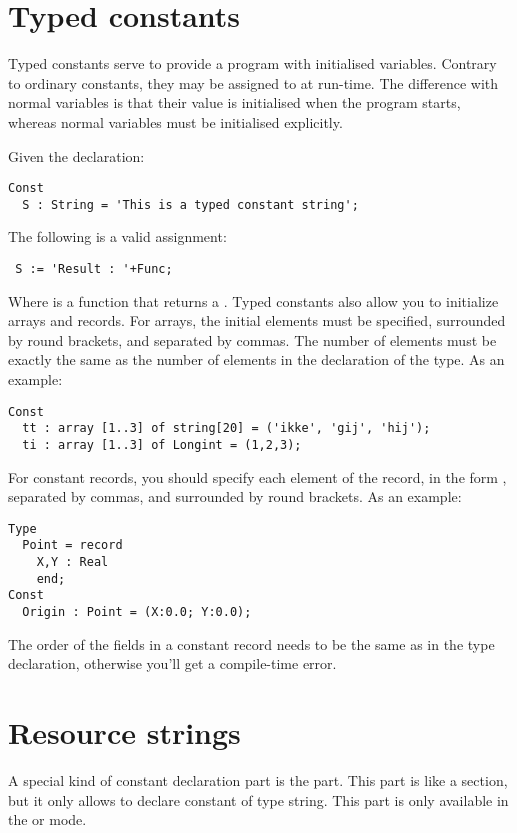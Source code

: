 \documentclass{report}
\begin{document}
\section{Typed constants}
Typed constants serve to provide a program with initialised variables.
Contrary to ordinary constants, they may be assigned to at run-time.
The difference with normal variables is that their value is initialised
when the program starts, whereas normal variables must be initialised
explicitly.

Given the declaration:
\begin{verbatim}
Const
  S : String = 'This is a typed constant string';
\end{verbatim}
The following is a valid assignment:
\begin{verbatim}
 S := 'Result : '+Func;
\end{verbatim}
Where  is a function that returns a .
Typed constants also allow you to initialize arrays and records. For arrays,
the initial elements must be specified, surrounded by round brackets, and
separated by commas. The number of elements must be exactly the same as
the number of elements in the declaration of the type.
As an example:
\begin{verbatim}
Const
  tt : array [1..3] of string[20] = ('ikke', 'gij', 'hij');
  ti : array [1..3] of Longint = (1,2,3);
\end{verbatim}
For constant records, you should specify each element of the record, in the
form , separated by commas, and surrounded by round
brackets.
As an example:
\begin{verbatim}
Type
  Point = record
    X,Y : Real
    end;
Const
  Origin : Point = (X:0.0; Y:0.0);
\end{verbatim}
The order of the fields in a constant record needs to be the same as in the type declaration,
otherwise you'll get a compile-time error.
\section{Resource strings}
\label{se:resourcestring}
A special kind of constant declaration part is the 
part. This part is like a  section, but it only allows
to declare constant of type string. This part is only available in the
 or  mode.
\end{document}
